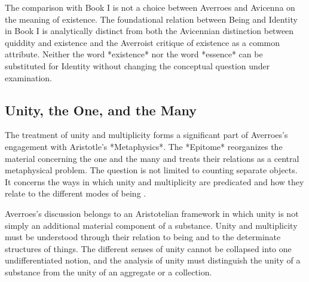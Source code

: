 \label{para:VS.B01.P01.C08.S15.SS08.P005}

The comparison with Book I is not a choice between
Averroes and Avicenna on the meaning of existence.
The foundational relation between Being and Identity
in Book I is analytically distinct from both the
Avicennian distinction between quiddity and existence
and the Averroist critique of existence as a common
attribute. Neither the word *existence* nor the word
*essence* can be substituted for Identity without
changing the conceptual question under examination.



\subsection{Unity, the One, and the Many}
\label{subsec:ch08_s15_ss09}

\label{para:VS.B01.P01.C08.S15.SS09.P001}

The treatment of unity and multiplicity forms a significant
part of Averroes's engagement with Aristotle's *Metaphysics*.
The *Epitome* reorganizes the material concerning the one
and the many and treats their relations as a central
metaphysical problem. The question is not limited to
counting separate objects. It concerns the ways in
which unity and multiplicity are predicated and how
they relate to the different modes of being
\citep{AristotleMetaphysics,
AverroesEpitomeMetaphysicsArnzen2010}.

\label{para:VS.B01.P01.C08.S15.SS09.P002}

Averroes's discussion belongs to an Aristotelian framework
in which unity is not simply an additional material
component of a substance. Unity and multiplicity must
be understood through their relation to being and to
the determinate structures of things. The different
senses of unity cannot be collapsed into one undifferentiated
notion, and the analysis of unity must distinguish
the unity of a substance from the unity of an aggregate
or a collection.

\label{para:VS.B01.P01.C08.S15.SS09.P003}


